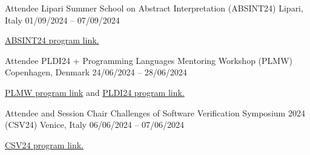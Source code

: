 
\begin{cventries}

    \cventry
        {Attendee} %
        {Lipari Summer School on Abstract Interpretation (ABSINT24)} %
        {Lipari, Italy} %
        {01/09/2024 – 07/09/2024} %
        {
        \begin{cvitems} %
            \item {\href{https://drive.google.com/file/d/1uhLXjf0C\_OeptfQwxXwk\_3T8aFOkDMYC/view?pli=1}{ABSINT24 program link.}}
        \end{cvitems}
        }

    \cventry
        {Attendee} %
        {PLDI24 + Programming Languages Mentoring Workshop (PLMW)} %
        {Copenhagen, Denmark} %
        {24/06/2024 – 28/06/2024} %
        {
        \begin{cvitems} %
            \item {\href{https://pldi24.sigplan.org/track/PLMW-PLDI-2024\#program}{PLMW program link}
            and \href{https://pldi24.sigplan.org/program/program-pldi-2024/}{PLDI24 program link.}}
        \end{cvitems}
        }

    \vspace{-.7em}  %
    \hspace*{-.4em} %

    \cventry
        {Attendee and Session Chair} %
        {Challenges of Software Verification Symposium 2024 (CSV24)} %
        {Venice, Italy} %
        {06/06/2024 – 07/06/2024} %
        {
        \begin{cvitems} %
            \item {\href{https://unive-ssv.github.io/events/2024/06/06/csv.html}{CSV24 program link.}}
        \end{cvitems}
        }
\end{cventries}
